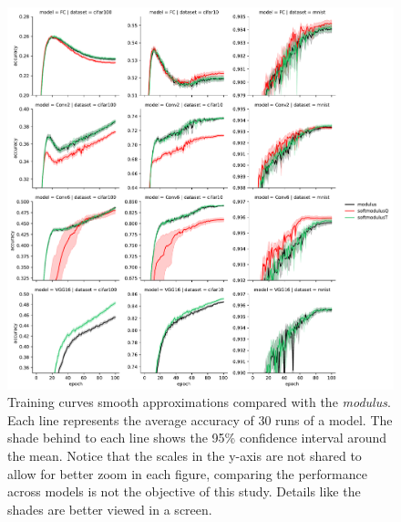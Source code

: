\begin{figure}[h!]
	\centering
	\includegraphics[width=1.0\linewidth]{modulus/images/training_curves_smooth}
	\caption{Training curves smooth approximations compared with the \textit{modulus}. Each line represents the average accuracy of 30 runs of a model. The shade behind to each line shows the 95\% confidence interval around the mean. Notice that the scales in the y-axis are not shared to allow for better zoom in each figure, comparing the performance across models is not the objective of this study. Details like the shades are better viewed in a screen.}
	\label{fig:training_curves_smooth}
\end{figure}

